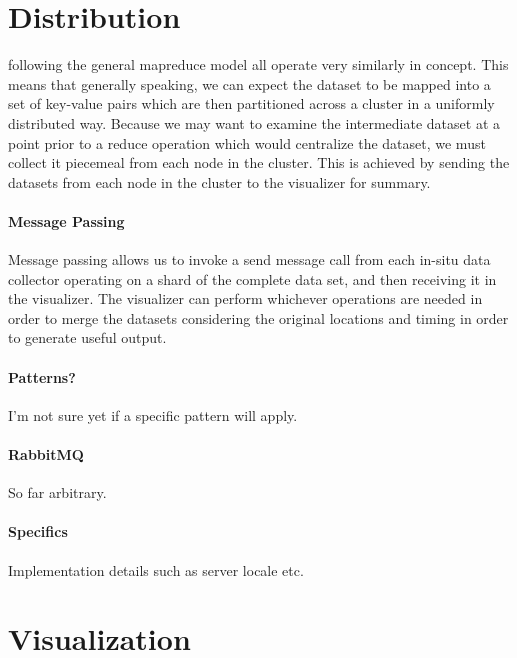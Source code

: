 \section{Distribution}
\label{sec:distribution}
 following the general mapreduce model all operate very similarly in concept. This means that generally speaking, we can expect the dataset to be mapped into a set of key-value pairs which are then partitioned across a cluster in a uniformly distributed way. Because we may want to examine the intermediate dataset at a point prior to a reduce operation which would centralize the dataset, we must collect it piecemeal from each node in the cluster. This is achieved by sending the datasets from each node in the cluster to the visualizer for summary. 

\paragraph{Message Passing}
Message passing allows us to invoke a send message call from each in-situ data collector operating on a shard of the complete data set, and then receiving it in the visualizer. The visualizer can perform whichever operations are needed in order to merge the datasets considering the original locations and timing in order to generate useful output. 

\paragraph{Patterns?}
I'm not sure yet if a specific pattern will apply.

\paragraph{RabbitMQ}
So far arbitrary.

\paragraph{Specifics}
Implementation details such as server locale etc.

\section{Visualization}
\label{visualization}


